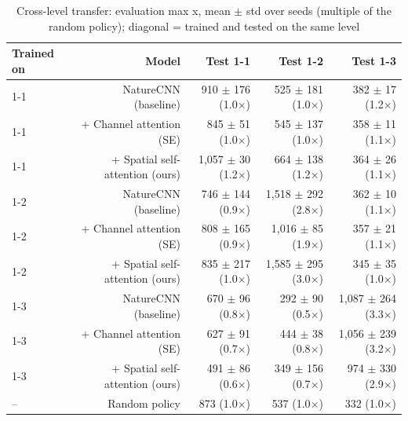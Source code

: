 \begin{table}[t]
\centering
\caption{Cross-level transfer: evaluation max x, mean $\pm$ std over seeds (multiple of the random policy); diagonal = trained and tested on the same level}
\label{tab:transfer_matrix}
\begin{tabular}{lrrrr}
\toprule
Trained on & Model & Test 1-1 & Test 1-2 & Test 1-3 \\
\midrule
1-1 & NatureCNN (baseline) & 910 $\pm$ 176 (1.0$\times$) & 525 $\pm$ 181 (1.0$\times$) & 382 $\pm$ 17 (1.2$\times$) \\
1-1 & + Channel attention (SE) & 845 $\pm$ 51 (1.0$\times$) & 545 $\pm$ 137 (1.0$\times$) & 358 $\pm$ 11 (1.1$\times$) \\
1-1 & + Spatial self-attention (ours) & 1,057 $\pm$ 30 (1.2$\times$) & 664 $\pm$ 138 (1.2$\times$) & 364 $\pm$ 26 (1.1$\times$) \\
1-2 & NatureCNN (baseline) & 746 $\pm$ 144 (0.9$\times$) & 1,518 $\pm$ 292 (2.8$\times$) & 362 $\pm$ 10 (1.1$\times$) \\
1-2 & + Channel attention (SE) & 808 $\pm$ 165 (0.9$\times$) & 1,016 $\pm$ 85 (1.9$\times$) & 357 $\pm$ 21 (1.1$\times$) \\
1-2 & + Spatial self-attention (ours) & 835 $\pm$ 217 (1.0$\times$) & 1,585 $\pm$ 295 (3.0$\times$) & 345 $\pm$ 35 (1.0$\times$) \\
1-3 & NatureCNN (baseline) & 670 $\pm$ 96 (0.8$\times$) & 292 $\pm$ 90 (0.5$\times$) & 1,087 $\pm$ 264 (3.3$\times$) \\
1-3 & + Channel attention (SE) & 627 $\pm$ 91 (0.7$\times$) & 444 $\pm$ 38 (0.8$\times$) & 1,056 $\pm$ 239 (3.2$\times$) \\
1-3 & + Spatial self-attention (ours) & 491 $\pm$ 86 (0.6$\times$) & 349 $\pm$ 156 (0.7$\times$) & 974 $\pm$ 330 (2.9$\times$) \\
– & Random policy & 873 (1.0$\times$) & 537 (1.0$\times$) & 332 (1.0$\times$) \\
\bottomrule
\end{tabular}
\end{table}
